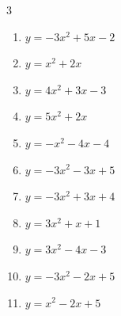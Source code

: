 \begin{multicols}{3}
\begin{enumerate}
  \item $\displaystyle y=-3x^{2}+5x-2$


  \item $\displaystyle y=x^{2}+2x$

        \phantom{$\displaystyle 頂点\left( -1 , -1 \right)$}

  \item $\displaystyle y=4x^{2}+3x-3$


  \item $\displaystyle y=5x^{2}+2x$


\columnbreak %

  \item $\displaystyle y=-x^{2}-4x-4$

        \phantom{$\displaystyle 頂点\left( -2 , 0 \right)$}

  \item $\displaystyle y=-3x^{2}-3x+5$


  \item $\displaystyle y=-3x^{2}+3x+4$


  \item $\displaystyle y=3x^{2}+x+1$


  \item $\displaystyle y=3x^{2}-4x-3$


\columnbreak %

\resetques

  \item $\displaystyle y=-3x^{2}-2x+5$


  \item $\displaystyle y=x^{2}-2x+5$


\end{enumerate}
\end{multicols}

